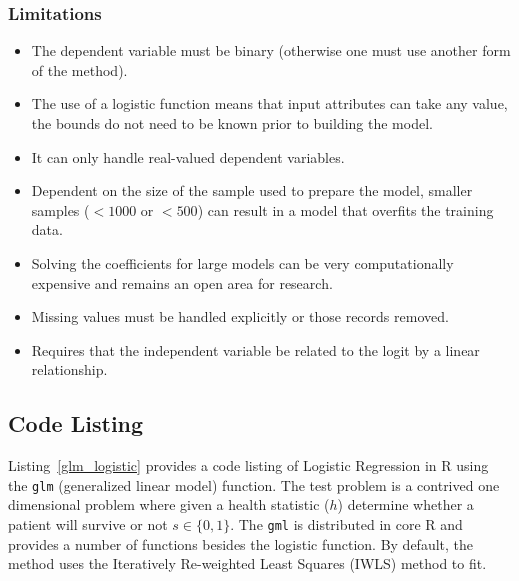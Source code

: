 \subsubsection{Limitations}

\begin{itemize}
	\item The dependent variable must be binary (otherwise one must use another form of the method).
	\item The use of a logistic function means that input attributes can take any value, the bounds do not need to be known prior to building the model.
	\item It can only handle real-valued dependent variables.
	\item Dependent on the size of the sample used to prepare the model, smaller samples ($<1000$ or $<500$) can result in a model that overfits the training data.
	\item Solving the coefficients for large models can be very computationally expensive and remains an open area for research.
	\item Missing values must be handled explicitly or those records removed.
	\item Requires that the independent variable be related to the logit by a linear relationship.
\end{itemize}


\subsection{Code Listing}
Listing~\ref{glm_logistic} provides a code listing of Logistic Regression in R using the \texttt{glm} (generalized linear model) function. 
The test problem is a contrived one dimensional problem where given a health statistic ($h$) determine whether a patient will survive or not $s\in\{0,1\}$.
The \texttt{gml} is distributed in core R and provides a number of functions besides the logistic function. By default, the method uses the Iteratively Re-weighted Least Squares (IWLS) method to fit.




